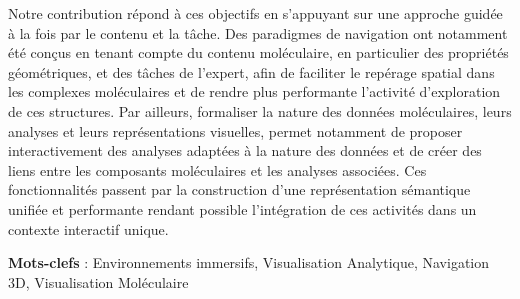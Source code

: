 Notre contribution répond à ces objectifs en s'appuyant sur une approche guidée à la fois par le contenu et la tâche. Des paradigmes de navigation ont notamment été conçus en tenant compte du contenu moléculaire, en particulier des propriétés géométriques, et des tâches de l'expert, afin de faciliter le repérage spatial dans les complexes moléculaires et de rendre plus performante l'activité d'exploration de ces structures. Par ailleurs, formaliser la nature des données moléculaires, leurs analyses et leurs représentations visuelles, permet notamment de proposer interactivement des analyses adaptées à la nature des données et de créer des liens entre les composants moléculaires et les analyses associées. Ces fonctionnalités passent par la construction d'une représentation sémantique unifiée et performante rendant possible l'intégration de ces activités dans un contexte interactif unique. 


\textbf{Mots-clefs} : Environnements immersifs, Visualisation Analytique, Navigation 3D, Visualisation Moléculaire



